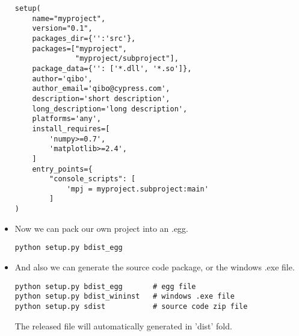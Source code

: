 \documentclass{article}
\begin{document}
\begin{itemize}
\begin{lstlisting}
setup(
    name="myproject",
    version="0.1",
    packages_dir={'':'src'},
    packages=["myproject",
              "myproject/subproject"],
    package_data={'': ['*.dll', '*.so']},
    author='qibo',
    author_email='qibo@cypress.com',
    description='short description',
    long_description='long description',
    platforms='any',
    install_requires=[
        'numpy>=0.7',
        'matplotlib>=2.4',
    ]
    entry_points={
        "console_scripts": [
            'mpj = myproject.subproject:main'
        ]
)
\end{lstlisting}
\item
Now we can pack our own project into an .egg.
\begin{lstlisting}
python setup.py bdist_egg
\end{lstlisting}
\item
And also we can generate the source code package, or the windows .exe file.
\begin{lstlisting}
python setup.py bdist_egg       # egg file
python setup.py bdist_wininst   # windows .exe file
python setup.py sdist           # source code zip file
\end{lstlisting}
The released file will automatically generated in 'dist' fold.
\end{itemize}

\newpage
\end{document}
